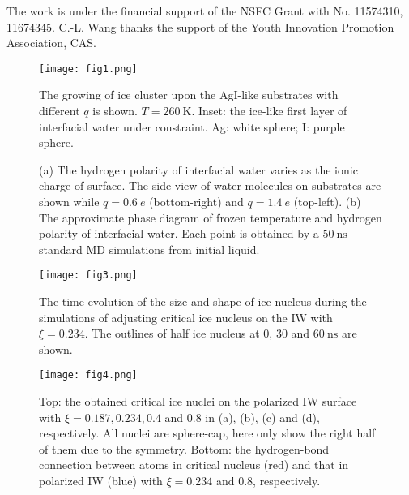 \documentclass[aps,prl,twocolumn,superscriptaddress]{revtex4-1}
\begin{document}
The work is under the financial support of the NSFC Grant with No. 11574310, 11674345. C.-L. Wang thanks the support of the Youth Innovation Promotion Association, CAS. 


\begin{figure}[ht]
\centering{}\texttt{[image: fig1.png]} 
\caption{The growing of ice cluster upon the AgI-like substrates with different $q$ is shown. $T=260~\mathrm{K}$.
Inset: the ice-like first layer of interfacial water under constraint. Ag: white sphere; I: purple sphere. 
\label{fig:fig1} }
\end{figure}

\begin{figure}[ht]
  \centering
\caption{ (a) The hydrogen polarity of interfacial water varies as the ionic charge of surface. The side view of water molecules on substrates are shown while $q =0.6~ e$ (bottom-right) and $q= 1.4~e $ (top-left). (b) The approximate  phase diagram of frozen temperature and hydrogen polarity of interfacial water. Each point is obtained by a $50~ \mathrm{ns}$ standard MD simulations from initial liquid.
 }
\label{fig:fig2} 
\end{figure}


\begin{figure}[ht]
\centering{}\texttt{[image: fig3.png]} 
\caption{ The time evolution of the size and shape of ice nucleus during the simulations of adjusting critical ice nucleus  on the IW with $\xi=0.234$. The outlines of half ice nucleus at $0$, $30$ and $60~\mathrm{ns}$ are shown.  
\label{fig:fig3} }
\end{figure}

\begin{figure}[ht]
\centering{}\texttt{[image: fig4.png]} 
\caption{ Top: the obtained critical ice nuclei on the polarized IW surface with $\xi = 0.187, 0.234, 0.4$ and $0.8$ in (a), (b), (c) and (d), respectively. All nuclei are sphere-cap, here only show the right half of them due to the symmetry. Bottom:  the hydrogen-bond connection between atoms in critical nucleus (red) and that in polarized IW (blue) with $\xi =0.234$ and $0.8$, respectively. 
\label{fig:fig4} }
\end{figure}
\end{document}
